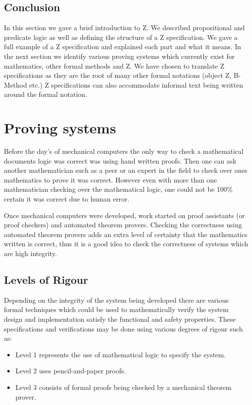 \subsection{Conclusion}

In this section we gave a brief introduction to Z. We described
 propositional and predicate logic as well as defining the
structure of a Z specification. We gave a full example of a Z specification and
explained each part and what it means. In the next section we identify various
proving systems which currently exist for mathematics, other formal methods and
 Z. We have chosen to translate Z specifications as they are the root of many
 other formal notations (object Z, B-Method etc.) Z specifications can also
 accommodate informal text being written around the formal notation.

\section{Proving systems}

Before the day's of mechanical computers the only way to check a mathematical
documents logic was correct was using hand written proofs. Then one can ask
another mathematician such as a peer or an expert in the field to check over
ones mathematics to prove it was correct. However even with more than one
mathematician checking over the mathematical logic, one could not be 100\%
certain it was correct due to human error. 

Once mechanical computers were developed, work started on proof assistants (or
proof checkers) and automated theorem provers. Checking the correctness using
automated theorem provers adds an extra level of certainty
that the mathematics written is correct, thus it is a good idea to check the
correctness of systems which are high integrity.

\subsection{Levels of Rigour}

Depending on the integrity of the system being developed there are various
formal techniques which could be used to mathematically verify the system design
and implementation satisfy the functional and safety properties. These
specifications and verifications may be done using various degrees of rigour
such as:

\begin{itemize}
\item Level 1 represents the use of mathematical logic to specify the system.
\item Level 2 uses pencil-and-paper proofs.
\item Level 3 consists of formal proofs being checked by a mechanical theorem
prover.
\end{itemize}


